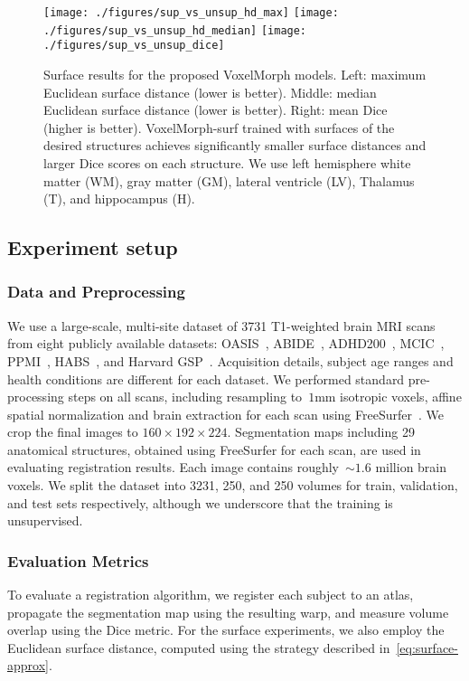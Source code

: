 \documentclass{article}
\newcommand{\citep}{\cite}
\begin{document}
\begin{figure*}[t!]
	\centering
\texttt{[image: ./figures/sup\_vs\_unsup\_hd\_max]}
\texttt{[image: ./figures/sup\_vs\_unsup\_hd\_median]}
\texttt{[image: ./figures/sup\_vs\_unsup\_dice]}
\caption{Surface results for the proposed VoxelMorph models. Left: maximum Euclidean surface distance (lower is better). Middle: median Euclidean surface distance (lower is better). Right: mean Dice (higher is better). VoxelMorph-surf trained with surfaces of the desired structures achieves significantly smaller surface distances and larger Dice scores on each structure.   We use left hemisphere white matter (WM), gray matter (GM), lateral ventricle (LV), Thalamus (T), and hippocampus (H).}
	\label{fig:surf-boxplot}
\end{figure*}




\subsection{Experiment setup}

\subsubsection{Data and Preprocessing}
We use a large-scale, multi-site dataset of 3731 T1-weighted brain MRI scans from eight publicly available datasets: OASIS~\citep{marcus2007open}, ABIDE~\citep{di2014autism}, ADHD200~\citep{milham2012adhd}, MCIC~\citep{gollub2013mcic}, PPMI~\citep{marek2011parkinson}, HABS~\citep{dagley2015harvard}, and Harvard GSP~\citep{holmes2015brain}. Acquisition details, subject age ranges and health conditions are different for each dataset. We performed standard pre-processing steps on all scans, including resampling to~$1$mm isotropic voxels, affine spatial normalization and brain extraction for each scan using FreeSurfer~\citep{fischl2012}. We crop the final images to $160\times 192 \times 224$. Segmentation maps including 29 anatomical structures, obtained using FreeSurfer for each scan, are used in evaluating registration results.  Each image contains roughly~$\sim1.6$ million brain voxels. We split the dataset into 3231, 250, and 250 volumes for train, validation, and test sets respectively, although we underscore that the training is unsupervised.

\subsubsection{Evaluation Metrics}
To evaluate a registration algorithm, we register each subject to an atlas, propagate the segmentation map using the resulting warp, and measure volume overlap using the Dice metric. For the surface experiments, we also employ the Euclidean surface distance, computed using the strategy described in~\eqref{eq:surface-approx}. 
\end{document}
